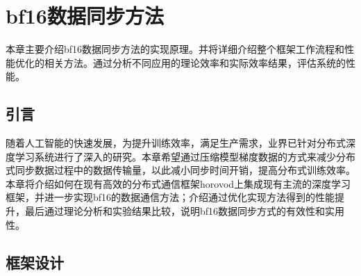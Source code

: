 \chapter{bf16数据同步方法}
本章主要介绍bf16数据同步方法的实现原理。并将详细介绍整个框架工作流程和性能优化的相关方法。通过分析不同应用的理论效率和实际效率结果，评估系统的性能。
\section{引言}
随着人工智能的快速发展，为提升训练效率，满足生产需求，业界已针对分布式深度学习系统进行了深入的研究。本章希望通过压缩模型梯度数据的方式来减少分布式同步数据过程中的数据传输量，以此减小同步时间开销，提高分布式训练效率。本章将介绍如何在现有高效的分布式通信框架horovod上集成现有主流的深度学习框架，并进一步实现bf16的数据通信方法；介绍通过优化实现方法得到的性能提升，最后通过理论分析和实验结果比较，说明bf16数据同步方式的有效性和实用性。
\section{框架设计}

